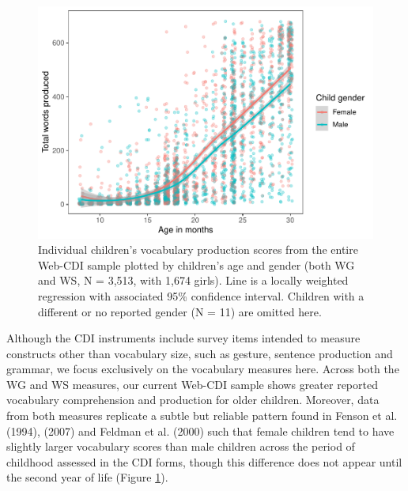 \documentclass[
  english,
  man]{apa7}
\begin{document}
\begin{figure}
\centering
\includegraphics{webcdi_paper_files/figure-latex/genderfig-1.pdf}
\caption{\label{fig:genderfig}Individual children's vocabulary production scores from the entire Web-CDI sample plotted by children's age and gender (both WG and WS, N = 3,513, with 1,674 girls). Line is a locally weighted regression with associated 95\% confidence interval. Children with a different or no reported gender (N = 11) are omitted here.}
\end{figure}

Although the CDI instruments include survey items intended to measure constructs other than vocabulary size, such as gesture, sentence production and grammar, we focus exclusively on the vocabulary measures here. Across both the WG and WS measures, our current Web-CDI sample shows greater reported vocabulary comprehension and production for older children. Moreover, data from both measures replicate a subtle but reliable pattern found in Fenson et al. (1994), (2007) and Feldman et al. (2000) such that female children tend to have slightly larger vocabulary scores than male children across the period of childhood assessed in the CDI forms, though this difference does not appear until the second year of life (Figure \ref{fig:genderfig}).
\end{document}
